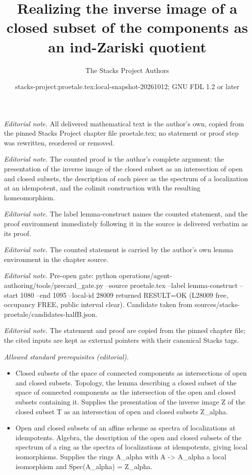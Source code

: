 \documentclass[10pt,a4paper]{amsart}
\title{Realizing the inverse image of a closed subset of the components as an ind-Zariski quotient}
\author{The Stacks Project Authors}
\date{stacks-project:proetale.tex:local-snapshot-20261012; GNU FDL 1.2 or later}
\theoremstyle{plain}
\theoremstyle{definition}
\theoremstyle{remark}
\numberwithin{equation}{subsection}
\begin{document}
\maketitle
\noindent\textit{Editorial note.} All delivered mathematical text is the author's own, copied from the pinned Stacks Project chapter file proetale.tex; no statement or proof step was rewritten, reordered or removed.\par\medskip
\noindent\textit{Editorial note.} The counted proof is the author's complete argument: the presentation of the inverse image of the closed subset as an intersection of open and closed subsets, the description of each piece as the spectrum of a localization at an idempotent, and the colimit construction with the resulting homeomorphism.\par\medskip
\noindent\textit{Editorial note.} The label lemma-construct names the counted statement, and the proof environment immediately following it in the source is delivered verbatim as its proof.\par\medskip
\noindent\textit{Editorial note.} The counted statement is carried by the author's own lemma environment in the chapter source.\par\medskip
\noindent\textit{Editorial note.} Pre-open gate: python operations/agent-authoring/tools/precard\_gate.py --source proetale.tex --label lemma-construct --start 1080 --end 1095 --local-id 28009 returned RESULT=OK (L28009 free, occupancy FREE, public interval clear). Candidate taken from sources/stacks-proetale/candidates-halfB.json.\par\medskip
\noindent\textit{Editorial note.} The statement and proof are copied from the pinned chapter file; the cited inputs are kept as external pointers with their canonical Stacks tags.\par\medskip
\noindent\textit{Allowed standard prerequisites (editorial).}\begin{itemize}
\item Closed subsets of the space of connected components as intersections of open and closed subsets. Topology, the lemma describing a closed subset of the space of connected components as the intersection of the open and closed subsets containing it. Supplies the presentation of the inverse image Z of the closed subset T as an intersection of open and closed subsets Z\_alpha.
\item Open and closed subsets of an affine scheme as spectra of localizations at idempotents. Algebra, the description of the open and closed subsets of the spectrum of a ring as the spectra of localizations at idempotents, giving local isomorphisms. Supplies the rings A\_alpha with A -> A\_alpha a local isomorphism and Spec(A\_alpha) = Z\_alpha.
\end{itemize}\medskip
\end{document}
